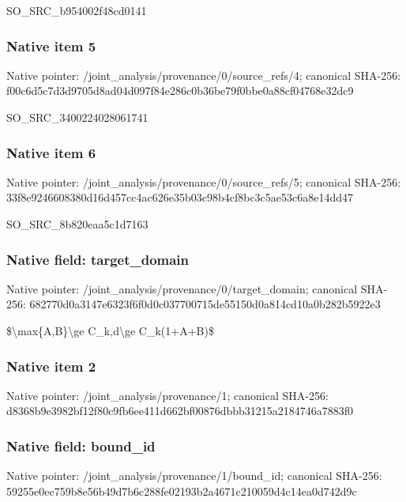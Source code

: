 \documentclass[10pt,a4paper]{article}
\begin{document}
\begingroup\raggedright\sloppy SO\_\allowbreak{}SRC\_\allowbreak{}b954002f48cd0141\par\endgroup

\subsubsection{Native item 5}
Native pointer: /joint\_\allowbreak{}analysis/provenance/0/source\_\allowbreak{}refs/4; canonical SHA-256: f00c6d5c7d3d9705d8ad04d097f84e286c0b36be79f0bbe0a88cf04768e32dc9

\begingroup\raggedright\sloppy SO\_\allowbreak{}SRC\_\allowbreak{}3400224028061741\par\endgroup

\subsubsection{Native item 6}
Native pointer: /joint\_\allowbreak{}analysis/provenance/0/source\_\allowbreak{}refs/5; canonical SHA-256: 33f8e9246608380d16d457cc4ac626e35b03c98b4cf8bc3c5ae53c6a8e14dd47

\begingroup\raggedright\sloppy SO\_\allowbreak{}SRC\_\allowbreak{}8b820eaa5c1d7163\par\endgroup

\subsubsection{Native field: target\_\allowbreak{}domain}
Native pointer: /joint\_\allowbreak{}analysis/provenance/0/target\_\allowbreak{}domain; canonical SHA-256: 682770d0a3147e6323f6f0d0c037700715de55150d0a814cd10a0b282b5922e3

\begingroup\raggedright\sloppy \$\textbackslash{}max\{A,\allowbreak{}B\}\textbackslash{}ge C\_\allowbreak{}k,\allowbreak{}d\textbackslash{}ge C\_\allowbreak{}k(1+A+B)\$\par\endgroup

\subsubsection{Native item 2}
Native pointer: /joint\_\allowbreak{}analysis/provenance/1; canonical SHA-256: d8368b9e3982bf12f80c9fb6ee411d662bf00876dbbb31215a2184746a7883f0

\subsubsection{Native field: bound\_\allowbreak{}id}
Native pointer: /joint\_\allowbreak{}analysis/provenance/1/bound\_\allowbreak{}id; canonical SHA-256: 59255e0ec759b8e56b49d7b6c288fe02193b2a4671c210059d4c14ea0d742d9c
\end{document}
